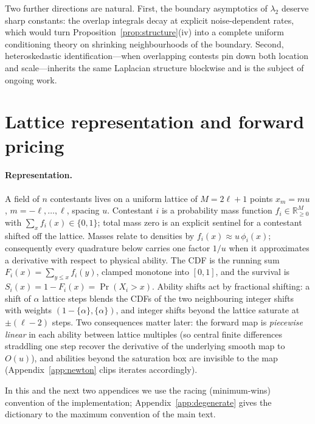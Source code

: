 \documentclass[11pt]{article}
\theoremstyle{definition}
\theoremstyle{remark}
\newcommand{\R}{\mathbb{R}}
\begin{document}
Two further directions are natural.  First, the boundary asymptotics of
$\lambda_2$ deserve sharp constants: the overlap integrals decay at explicit
noise-dependent rates, which would turn
Proposition~\ref{prop:structure}(iv) into a complete uniform conditioning
theory on shrinking neighbourhoods of the boundary.  Second, heteroskedastic
identification---when overlapping contests pin down both location and
scale---inherits the same Laplacian structure blockwise and is the subject
of ongoing work.

\printbibliography

\appendix

\section{Lattice representation and forward pricing}
\label{app:lattice}

\paragraph{Representation.}
A field of $n$ contestants lives on a uniform lattice of $M = 2\ell+1$
points $x_m = m u$, $m = -\ell,\dots,\ell$, spacing $u$.  Contestant $i$ is a
probability mass function $f_i \in \R_{\ge0}^{M}$ with
$\sum_x f_i(x) \in \{0, 1\}$; total mass zero is an explicit sentinel for a
contestant shifted off the lattice.  Masses relate to densities by
$f_i(x) \approx u\,\phi_i(x)$; consequently every quadrature below carries
one factor $1/u$ when it approximates a derivative with respect to physical
ability.  The CDF is the running sum $F_i(x) = \sum_{y \le x} f_i(y)$,
clamped monotone into $[0,1]$, and the survival is
$S_i(x) = 1 - F_i(x) = \Pr(X_i > x)$.  Ability shifts act by fractional
shifting: a shift of $\alpha$ lattice steps blends the CDFs of the two
neighbouring integer shifts with weights $(1-\{\alpha\}, \{\alpha\})$, and
integer shifts beyond the lattice saturate at $\pm(\ell-2)$ steps.  Two
consequences matter later: the forward map is \emph{piecewise linear} in
each ability between lattice multiples (so central finite differences
straddling one step recover the derivative of the underlying smooth map to
$O(u)$), and abilities beyond the saturation box are invisible to the map
(Appendix~\ref{app:newton} clips iterates accordingly).

In this and the next two appendices we use the racing (minimum-wins)
convention of the implementation; Appendix~\ref{app:degenerate} gives the
dictionary to the maximum convention of the main text.
\end{document}
